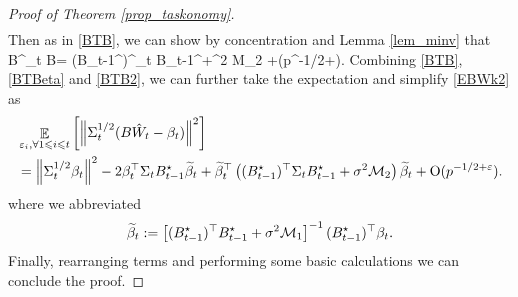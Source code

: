 \begin{proof}[Proof of Theorem \ref{prop_taskonomy}]
\begin{align}
\end{align}
Then as in \eqref{BTB}, we can show by concentration and Lemma \ref{lem_minv} that 
\be\label{BTB2}
B^\top \Sigma_t B=  (B_{t-1}^{\star})^\top \Sigma_t B_{t-1}^{\star}+\sigma^2 {\cal M}_2 +\OO(\sigma p^{-1/2+\e}).
\ee
Combining \eqref{BTB}, \eqref{BTBeta} and \eqref{BTB2}, we can further take the expectation and simplify \eqref{EBWk2} as
\begin{align*}
&\mathop{\mathbb{E}}_{\varepsilon_i, \forall 1\leqslant i\leqslant t}\left[ \left\|\Sigma_t^{1/2} (B\hat W_t -\beta_t)\right\|^2 \right]\\
&= \left\|\Sigma_t^{1/2} \beta_t\right\|^2 - 2\beta_t^\top \Sigma_t B_{t-1}^{\star} \widetilde\beta_t + \widetilde\beta_t^\top \left((B_{t-1}^{\star})^\top \Sigma_t B_{t-1}^{\star}+\sigma^2 {\mathcal M}_2 \right) \widetilde\beta_t + \operatorname{O}(p^{-1/2+{\varepsilon}}).
\end{align*}
where we abbreviated 
$$\widetilde\beta_t:=\left[(B_{t-1}^{\star})^\top B_{t-1}^{\star} +\sigma^2\mathcal M_1\right]^{-1}  (B_{t-1}^{\star})^\top \beta_t .$$
Finally, rearranging terms and performing some basic calculations we can conclude the proof.
\end{proof}

